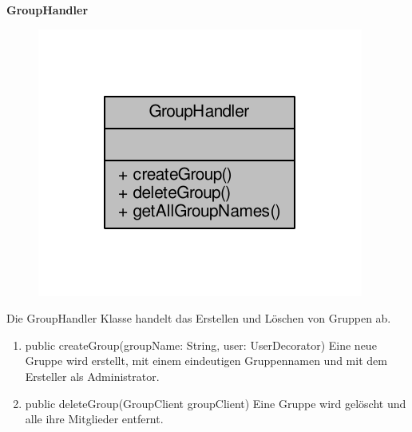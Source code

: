 \textbf{GroupHandler}
\begin{figure}[H]
	\includegraphics[scale = 1]{res/umlClasses/group_handler__coll__graph.pdf}
	\centering
\end{figure}
Die GroupHandler Klasse handelt das Erstellen und Löschen von Gruppen ab.
\begin{enumerate}
	\item public createGroup(groupName: String, user: UserDecorator)
		Eine neue Gruppe wird erstellt, mit einem eindeutigen Gruppennamen und mit dem Ersteller als Administrator.
	\item public deleteGroup(GroupClient groupClient)
		Eine Gruppe wird gelöscht und alle ihre Mitglieder entfernt.
\end{enumerate}


